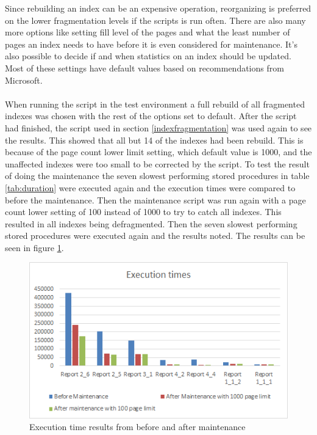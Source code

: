 \documentclass{cslthse-msc}
\begin{document}
Since rebuilding an index can be an expensive operation, reorganizing is preferred on the lower fragmentation levels if the scripts is run often. There are also many more options like setting fill level of the pages and what the least number of pages an index needs to have before it is even considered for maintenance. It's also possible to decide if and when statistics on an index should be updated. Most of these settings have default values based on recommendations from Microsoft.\\\\
When running the script in the test environment a full rebuild of all fragmented indexes was chosen with the rest of the options set to default. After the script had finished, the script used in section \ref{indexfragmentation} was used again to see the results. This showed that all but 14 of the indexes had been rebuild. This is because of the page count lower limit setting, which default value is 1000, and the unaffected indexes were too small to be corrected by the script. To test the result of doing the maintenance the seven slowest performing stored procedures in table \ref{tab:duration} were executed again and the execution times were compared to before the maintenance. Then the maintenance script was run again with a page count lower setting of 100 instead of 1000 to try to catch all indexes. This resulted in all indexes being defragmented. Then the seven slowest performing stored procedures were executed again and the results noted. The results can be seen in figure \ref{fig:beforeafter}.

\begin{figure}[H]
\begin{center}
\includegraphics[scale=1]{Pictures/beforeAndAfterMaintenance.png}
\caption{Execution time results from before and after maintenance}
\label{fig:beforeafter}
\end{center}
\end{figure} 
\end{document}

